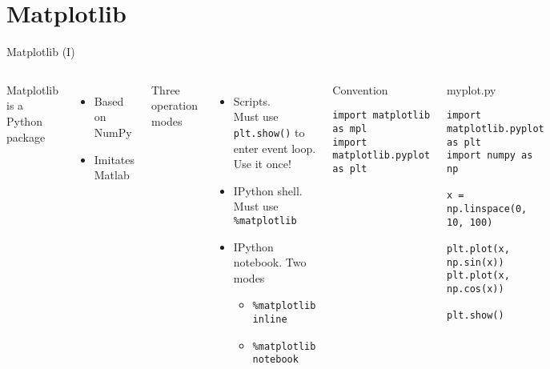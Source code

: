 \documentclass[10pt,compress]{beamer} %
\begin{document}
\section{Matplotlib}

\begin{frame}[fragile]{Matplotlib (I)}
	\begin{columns}
	Matplotlib is a Python package
	\begin{itemize}
		\item Based on NumPy
		\item Imitates Matlab
	\end{itemize}
	Three operation modes
	\begin{itemize}
		\item Scripts. \\Must use \texttt{plt.show()} to enter event loop. Use it once!
		\item IPython shell. \\Must use \texttt{\%matplotlib}
		\item IPython notebook. Two modes
		\begin{itemize}
			\item \texttt{\%matplotlib inline}
			\item \texttt{\%matplotlib notebook}
		\end{itemize}
	\end{itemize}

	\begin{block}{\footnotesize{Convention}}
	\vspace{-0.2cm} 
\begin{lstlisting}
import matplotlib as mpl
import matplotlib.pyplot as plt
\end{lstlisting}
	\vspace{-0.2cm} 
	\end{block}

	\begin{exampleblock}{\footnotesize{myplot.py}}
	\vspace{-0.2cm} 
\begin{lstlisting}
import matplotlib.pyplot as plt
import numpy as np

x = np.linspace(0, 10, 100)

plt.plot(x, np.sin(x))
plt.plot(x, np.cos(x))

plt.show()
\end{lstlisting}
	\vspace{-0.2cm} 
	\end{exampleblock}

	\end{columns}
\end{frame}
\end{document}
